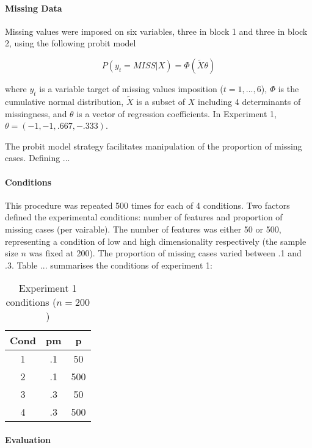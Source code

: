 \paragraph{Missing Data}

Missing values were imposed on six variables, three in block 1 and three in block 2, using the following probit model 

\begin{equation}
	P(y_t = MISS | X) = \Phi(\tilde{X} \theta) \label{eq:PBT_imp}
\end{equation}

where $y_t$ is a variable target of missing values imposition ($t = 1,...,6$), $\Phi$ is the cumulative normal distribution,
$\tilde{X}$ is a subset of $X$ including 4 determinants of missingness, and $\theta$ is a vector of regression coefficients. 
In Experiment 1, $\theta = (-1, -1, .667, -.333)$.

The probit model strategy facilitates manipulation of the proportion of missing cases. Defining ...

\paragraph{Conditions}

This procedure was repeated 500 times for each of 4 conditions. Two factors defined the experimental conditions:
number of features and proportion of missing cases (per vairable). The number of features was either 50 or 500, 
representing a condition of low and high dimensionality respectively (the sample size $n$ was fixed at 200). The 
proportion of missing cases varied between .1 and .3. Table ... summarises the conditions of experiment 1:

\begin{table}[h]
	\centering
	\caption{Experiment 1 conditions ($n = 200$)}
	\break
	\begin{tabular}{ c c c }
		 Cond 	& pm 	& p 	\\ 
		 \hline
		 1	& .1 	& 50  	\\  
		 2	& .1 	& 500 	\\
		 3	& .3 	& 50  	\\
		 4	& .3 	& 500 	\\
		 \hline
	\end{tabular}
	\label{table:exp1_conds}
\end{table}

\paragraph{Evaluation}

